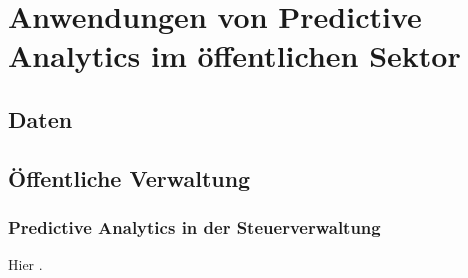 \chapter{Anwendungen von Predictive Analytics im öffentlichen Sektor}


\section{Daten}


\section{Öffentliche Verwaltung}



\subsection{Predictive Analytics in der Steuerverwaltung}

Hier \cite{OECD}.








